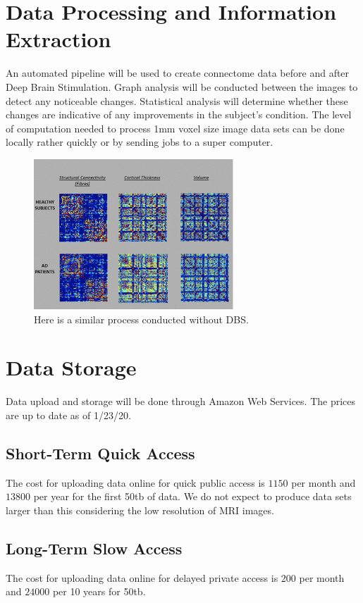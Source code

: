 \documentclass{article}
\begin{document}
\section{Data Processing and Information Extraction}
An automated pipeline will be used to create connectome data before and after Deep Brain Stimulation. \cite{Pipeline} Graph analysis will be conducted between the images to detect any noticeable changes. Statistical analysis will determine whether these changes are indicative of any improvements in the subject's condition. The level of computation needed to process 1mm voxel size image data sets can be done locally rather quickly or by sending jobs to a super computer.

\begin{figure}[h!]
\centering
\includegraphics[width=75mm, scale=1]{matrix}
\caption{Here is a similar process conducted without DBS. \cite{Pipeline}}
\label{fig:method}
\end{figure}
\section{Data Storage}
    Data upload and storage will be done through Amazon Web Services. The prices are up to date as of 1/23/20.
\subsection{Short-Term Quick Access}
    The cost for uploading data online for quick public access is $1150$ per month and $13800$ per year for the first 50tb of data. We do not expect to produce data sets larger than this considering the low resolution of MRI images. \cite{AWS}
\subsection{Long-Term Slow Access}
    The cost for uploading data online for delayed private access is $200$ per month and $24000$ per 10 years for 50tb. \cite{AWS}
\end{document}
